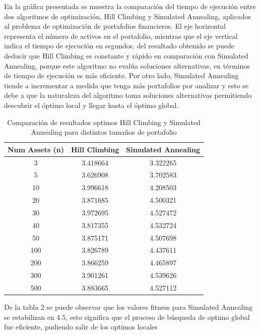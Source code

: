 \documentclass[9pt,a4paper,twoside]{rho-class/rho}
\begin{document}
        En la gráfica presentada se muestra la comparación del tiempo de ejecución entre dos algoritmos de optimización, Hill Climbing y Simulated Annealing, aplicados al problema de optimización de portafolios financieros. El eje horizontal representa el número de activos en el portafolio, mientras que el eje vertical indica el tiempo de ejecución en segundos, del resultado obtenido se puede deducir que Hill Climbing es constante y rápido en comparación con Simulated Annealing, porque este algoritmo no evalúa soluciones alternativas, en términos de tiempo de ejecución es más eficiente. Por otro lado, Simulated Annealing tiende a incrementar a medida que tenga más portafolios por analizar y esto se debe a que la naturaleza del algoritmo toma soluciones alternativas permitiendo descubrir el óptimo local y llegar hasta el óptimo global.


        \begin{table}[h]
            \centering
            \begin{tabular}{|c|c|c|}
            \hline
            \textbf{Num Assets (n)} & \textbf{Hill Climbing} & \textbf{Simulated Annealing} \\
            \hline
            3   & 3.418664 & 3.322265 \\
            5   & 3.626908 & 3.702583 \\
            10  & 3.996618 & 4.208503 \\
            20  & 3.871685 & 4.500321 \\
            30  & 3.972695 & 4.527472 \\
            40  & 3.817355 & 4.532724 \\
            50  & 3.875171 & 4.507698 \\
            100 & 3.826789 & 4.437611 \\
            200 & 3.866259 & 4.465897 \\
            300 & 3.901261 & 4.539626 \\
            500 & 3.883665 & 4.527112 \\
            \hline
            \end{tabular}
            \caption{Comparación de resultados optimos Hill Climbing y Simulated Annealing para distintos tamaños de portafolio}
            \label{tab:comparison}
        \end{table}

        De la tabla 2 se puede observar que los valores fitness para Simulated Annealing se estabilizan en 4.5, esto significa que el proceso de búsqueda de optimo global fue eficiente, pudiendo salir de los optimos locales 
\end{document}
